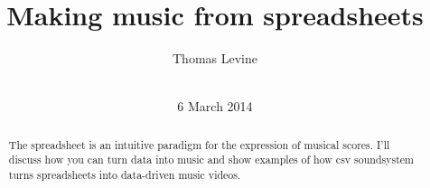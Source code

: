 \documentclass{acm_proc_article-sp}
\begin{document}
\title{Making music from spreadsheets}
\author{
\alignauthor
Thomas Levine\\
       \\
}
\date{6 March 2014}
\maketitle
\begin{abstract}
The spreadsheet is an intuitive paradigm for the expression of musical
scores. I'll discuss how you can turn data into music and show examples of
how csv soundsystem turns spreadsheets into data-driven music videos.
\end{abstract}
\end{document}
